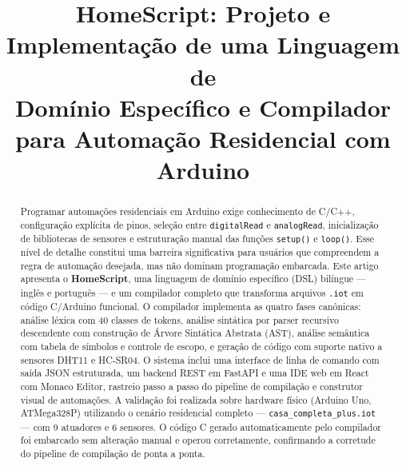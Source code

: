 \documentclass[conference]{IEEEtran}
\begin{document}
\title{HomeScript: Projeto e Implementação de uma Linguagem de\\
Domínio Específico e Compilador para Automação Residencial com Arduino}

\author{
\and
{}
\and
{}
\and
{}
\and
{}
}

\maketitle

\begin{abstract}
Programar automações residenciais em Arduino exige conhecimento de C/C++,
configuração explícita de pinos, seleção entre \texttt{digitalRead} e
\texttt{analogRead}, inicialização de bibliotecas de sensores e estruturação
manual das funções \texttt{setup()} e \texttt{loop()}. Esse nível de detalhe
constitui uma barreira significativa para usuários que compreendem a regra de
automação desejada, mas não dominam programação embarcada. Este artigo
apresenta o \textbf{HomeScript}, uma linguagem de domínio específico (DSL)
bilíngue — inglês e português — e um compilador completo que transforma
arquivos \texttt{.iot} em código C/Arduino funcional. O compilador implementa
as quatro fases canônicas: análise léxica com 40 classes de tokens, análise
sintática por parser recursivo descendente com construção de Árvore Sintática
Abstrata (AST), análise semântica com tabela de símbolos e controle de escopo,
e geração de código com suporte nativo a sensores DHT11 e HC-SR04. O sistema
inclui uma interface de linha de comando com saída JSON estruturada, um backend
REST em FastAPI e uma IDE web em React com Monaco Editor, rastreio passo a
passo do pipeline de compilação e construtor visual de automações. A validação
foi realizada sobre hardware físico (Arduino Uno, ATMega328P) utilizando o
cenário residencial completo — \texttt{casa\_completa\_plus.iot} — com 9
atuadores e 6 sensores. O código C gerado automaticamente pelo compilador foi
embarcado sem alteração manual e operou corretamente, confirmando a corretude
do pipeline de compilação de ponta a ponta.
\end{abstract}
\end{document}
